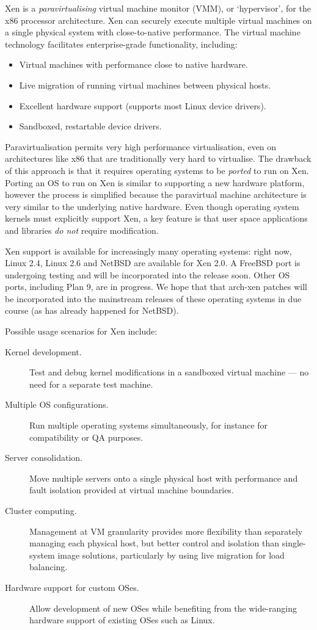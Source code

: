 \documentclass[11pt,twoside,final,openright]{report}
\begin{document}
Xen is a {\em paravirtualising} virtual machine monitor (VMM), or
`hypervisor', for the x86 processor architecture.  Xen can securely
execute multiple virtual machines on a single physical system with
close-to-native performance.  The virtual machine technology
facilitates enterprise-grade functionality, including:

\begin{itemize}
\item Virtual machines with performance close to native
  hardware.
\item Live migration of running virtual machines between physical hosts.
\item Excellent hardware support (supports most Linux device drivers).
\item Sandboxed, restartable device drivers.
\end{itemize}

Paravirtualisation permits very high performance virtualisation,
even on architectures like x86 that are traditionally
very hard to virtualise.
The drawback of this approach is that it requires operating systems to
be {\em ported} to run on Xen.  Porting an OS to run on Xen is similar
to supporting a new hardware platform, however the process
is simplified because the paravirtual machine architecture is very
similar to the underlying native hardware. Even though operating system
kernels must explicitly support Xen, a key feature is that user space
applications and libraries {\em do not} require modification.

Xen support is available for increasingly many operating systems:
right now, Linux 2.4, Linux 2.6 and NetBSD are available for Xen 2.0.
A FreeBSD port is undergoing testing and will be incorporated into the
release soon. Other OS ports, including Plan 9, are in progress.  We
hope that that arch-xen patches will be incorporated into the
mainstream releases of these operating systems in due course (as has
already happened for NetBSD).

Possible usage scenarios for Xen include:
\begin{description}
\item [Kernel development.] Test and debug kernel modifications in a
      sandboxed virtual machine --- no need for a separate test
      machine.
\item [Multiple OS configurations.] Run multiple operating systems
      simultaneously, for instance for compatibility or QA purposes.
\item [Server consolidation.] Move multiple servers onto a single
      physical host with performance and fault isolation provided at
      virtual machine boundaries. 
\item [Cluster computing.] Management at VM granularity provides more
      flexibility than separately managing each physical host, but
      better control and isolation than single-system image solutions, 
      particularly by using live migration for load balancing. 
\item [Hardware support for custom OSes.] Allow development of new OSes
      while benefiting from the wide-ranging hardware support of
      existing OSes such as Linux.
\end{description}
\end{document}
